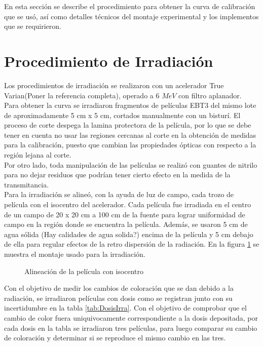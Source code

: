 En esta sección se describe el procedimiento para obtener la curva de calibración que se usó, así como detalles técnicos del montaje experimental y los implementos que se requirieron. 
\section{Procedimiento de Irradiación}
Los procedimientos de irradiación se realizaron con un acelerador True Varian(Poner la referencia completa), operado a 6 $ MeV$ con filtro aplanador.\\

Para obtener la curva se irradiaron fragmentos de películas EBT3 del mismo lote de aproximadamente 5 cm x 5 cm, cortados manualmente con un bisturí. El proceso de corte despega la lamina protectora de la película, por lo que se debe tener en cuenta no usar las regiones cercanas al corte en la obtención de medidas para la calibración, puesto que cambian las propiedades ópticas con respecto a la región lejana al corte. \\

Por otro lado, toda manipulación de las películas se realizó con guantes de nitrilo para no dejar residuos que podrían tener cierto efecto en la medida de la transmitancia. \\

Para la irradiación se alineó, con la ayuda de luz de campo, cada trozo de película con el isocentro del acelerador. Cada película fue irradiada en el centro de un campo de 20 x 20 cm a 100 cm de la fuente para lograr uniformidad de campo en la región donde se encuentra la película. Además, se usaron 5 cm de agua sólida (Hay calidades de agua solida?) encima de la película y 5 cm debajo de ella para regular efectos de la retro dispersión de la radiación. En la figura  \ref{fig:MontajePelicula} se muestra el montaje usado para la irradiación.\\
\begin{figure}
	\centering
	
	\caption{Alineación de la película con isocentro}
	\label{fig:MontajePelicula}
\end{figure}

Con el objetivo de medir los cambios de coloración que se dan debido a la radiación, se irradiaron películas con dosis como se registran junto con su incertidumbre en la tabla \ref{tab:DosisIrra}. Con el objetivo de comprobar que el cambio de color fuera uniquivocamente correspondiente a la dosis depositada, por cada dosis en la tabla se irradiaron tres películas, para luego comparar su cambio de coloración y determinar si se reproduce el mismo cambio en las tres.\\ 

